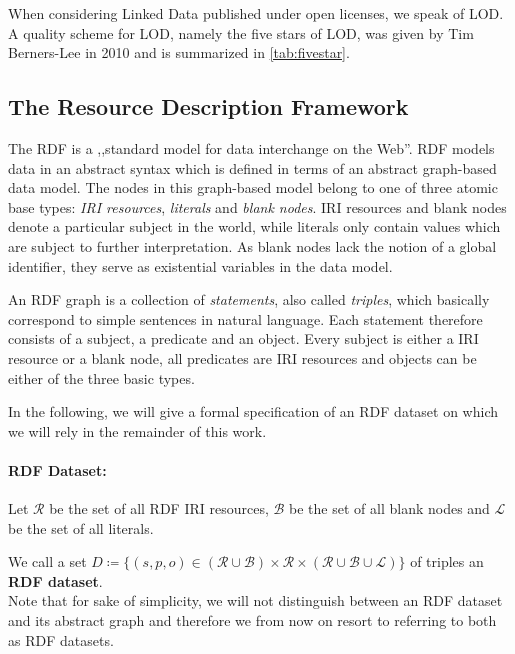 When considering Linked Data published under open licenses, we speak of \acf{LOD}.
A quality scheme for \ac{LOD}, namely the five stars of \ac{LOD}, was given by Tim Berners-Lee in 2010\cite{berners-lee:2006a} and is summarized in \autoref{tab:fivestar}.


\subsection{The Resource Description Framework}
\label{ssec:rdf}

The \acf{RDF} is a ,,standard model for data interchange on the Web''\cite{group:2014a}.
\ac{RDF} models data in an abstract syntax which is defined in terms of an abstract graph-based data model.
The nodes in this graph-based model belong to one of three atomic base types: \emph{\acs{IRI} resources}, \emph{literals} and \emph{blank nodes}.
\acs{IRI} resources and blank nodes denote a particular subject in the world, while literals only contain values which are subject to further interpretation.
As blank nodes lack the notion of a global identifier, they serve as existential variables in the data model.

An \ac{RDF} graph is a collection of \emph{statements}, also called \emph{triples}, which basically correspond to simple sentences in natural language.
Each statement therefore consists of a subject, a predicate and an object.
Every subject is either a \acs{IRI} resource or a blank node, all predicates are \acs{IRI} resources and objects can be either of the three basic types.

In the following, we will give a formal specification of an \ac{RDF} dataset on which we will rely in the remainder of this work.

\newpage
{}
\paragraph{RDF Dataset:} Let $\mathcal{R}$ be the set of all \ac{RDF} \ac{IRI} resources, $\mathcal{B}$ be the set of all blank nodes and $\mathcal{L}$ be the set of all literals.

We call a set $D\coloneq \{(s,p,o) \in (\mathcal{R}\cup\mathcal{B})\times\mathcal{R}\times(\mathcal{R}\cup\mathcal{B}\cup\mathcal{L})\} $ of triples an \textbf{\ac{RDF} dataset}.\\

Note that for sake of simplicity, we will not distinguish between an \ac{RDF} dataset and its abstract graph and therefore we from now on resort to referring to both as \ac{RDF} datasets.\\

